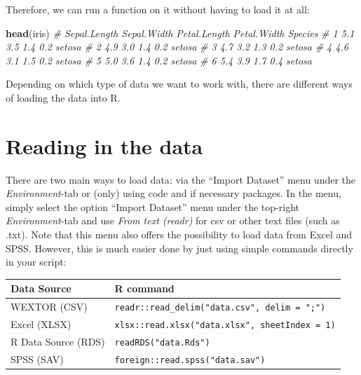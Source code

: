 \documentclass[
]{book}
\newenvironment{Shaded}{\begin{snugshade}}{\end{snugshade}}
\newcommand{\CommentTok}[1]{\textcolor[rgb]{0.56,0.35,0.01}{\textit{#1}}}
\newcommand{\FunctionTok}[1]{\textcolor[rgb]{0.13,0.29,0.53}{\textbf{#1}}}
\newcommand{\NormalTok}[1]{#1}
\begin{document}
Therefore, we can run a function on it without having to load it at all:

\begin{Shaded}
\begin{Highlighting}[]
\FunctionTok{head}\NormalTok{(iris)}
\CommentTok{\#   Sepal.Length Sepal.Width Petal.Length Petal.Width Species}
\CommentTok{\# 1          5.1         3.5          1.4         0.2  setosa}
\CommentTok{\# 2          4.9         3.0          1.4         0.2  setosa}
\CommentTok{\# 3          4.7         3.2          1.3         0.2  setosa}
\CommentTok{\# 4          4.6         3.1          1.5         0.2  setosa}
\CommentTok{\# 5          5.0         3.6          1.4         0.2  setosa}
\CommentTok{\# 6          5.4         3.9          1.7         0.4  setosa}
\end{Highlighting}
\end{Shaded}

Depending on which type of data we want to work with, there are different ways of loading the data into R.

\section{Reading in the data}\label{reading-in-the-data}

There are two main ways to load data: via the ``Import Dataset'' menu under the \emph{Environment}-tab or (only) using code and if necessary packages.
In the menu, simply select the option ``Import Dataset'' menu under the top-right \emph{Environment}-tab and use \emph{From text (readr)} for csv or other text files (such as .txt).
Note that this menu also offers the possibility to load data from Excel and SPSS.
However, this is much easier done by just using simple commands directly in your script:

\begin{longtable}[]{@{}ll@{}}
\toprule\noalign{}
Data Source & R command \\
\midrule\noalign{}
\endhead
\bottomrule\noalign{}
\endlastfoot
WEXTOR (CSV) & \texttt{readr::read\_delim("data.csv",\ delim\ =\ ";")} \\
Excel (XLSX) & \texttt{xlsx::read.xlsx("data.xlsx",\ sheetIndex\ =\ 1)} \\
R Data Source (RDS) & \texttt{readRDS("data.Rds")} \\
SPSS (SAV) & \texttt{foreign::read.spss("data.sav")} \\
\end{longtable}
\end{document}
